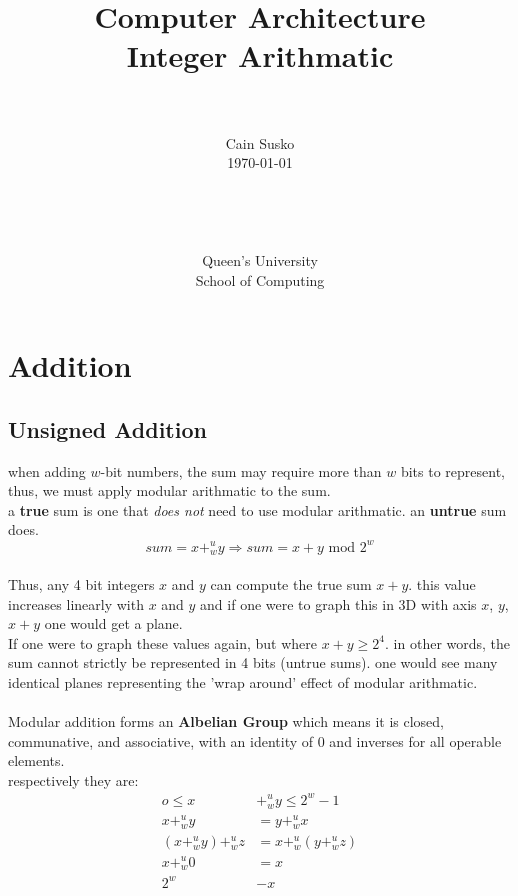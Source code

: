 \documentclass[12pt]{book}
\newcommand{\classID}{Integer Arithmatic}
\begin{document}
\date{}
\setlength{\parindent}{0em}  %

\title{Computer Architecture\\\classID}

\author{\\ \\ Cain Susko\\\today \\ \\ \\ \\ \\
        Queen's University \\School of Computing} 
 

\maketitle
\pagebreak


\section*{Addition}
\subsection*{Unsigned Addition}
when adding $w$-bit numbers, the sum may require more than $w$ bits to represent,
        thus, we must apply modular arithmatic to the sum.\\
a \textbf{true} sum is one that \textit{does not} need to use modular arithmatic. an \textbf{untrue} sum does.
\[sum = x+^{u}_{w}y \Rightarrow sum = x+y\text{ mod } 2^w\]

\paragraph{}
Thus, any 4 bit integers $x$ and $y$ can compute the true sum $x+y$. this value increases linearly with $x$ and $y$ and if one were
        to graph this in 3D with axis $x$, $y$, $x+y$ one would get a plane.\\
If one were to graph these values again, but where $x+y \geq 2^4$. in other words, the sum cannot strictly be represented in 4 bits (untrue sums). one would see
        many identical planes representing the 'wrap around' effect of modular arithmatic.

\paragraph{}
Modular addition forms an \textbf{Albelian Group} which means it is closed, communative, and associative, with an identity of 0 and 
        inverses for all operable elements.\\
respectively they are:
\begin{align*}
        o \leq x &+^{u}_{w}y\leq 2^w -1\\
        x +^{u}_{w}y &= y +^{u}_{w}x\\
        (x +^{u}_{w}y)+^{u}_{w}z &= x +^{u}_{w}(y +^{u}_{w}z)\\
        x+^{u}_{w}0 &= x\\
        2^w&-x
\end{align*}
\end{document}
